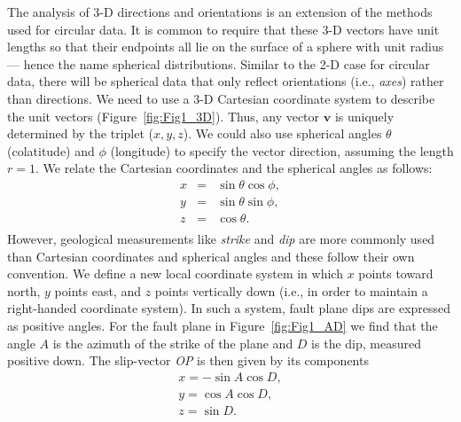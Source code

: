The analysis of 3-D directions and orientations is an extension of the methods used for circular data.
It is common to require that these 3-D vectors have unit lengths so that their endpoints all lie
on the surface of a sphere with unit radius --- hence the name spherical distributions.
Similar to the 2-D case for circular data, there will be spherical data that only reflect orientations (i.e., \emph{axes}) rather than directions.	 
\noindent
We need to use a 3-D Cartesian coordinate system to describe the unit vectors (Figure~\ref{fig:Fig1_3D}).  Thus, any 
vector $\mathbf{v}$ is uniquely determined by the triplet ($x,y,z$).  We could also use spherical angles
$\theta$ (colatitude)  and $\phi$ (longitude) to specify the vector direction, assuming the length $r=1$.
We relate the Cartesian coordinates and the spherical angles as follows:
\begin{equation}\begin{array}{rll}
x & = & \sin \theta \cos \phi,\\
y & = & \sin \theta \sin \phi,\\
z & = & \cos \theta.\\
\end{array}
\end{equation}	 	
However, geological measurements like \emph{strike} and \emph{dip} are more commonly used than Cartesian 
coordinates and spherical angles and these follow their own convention.  We define a new local 
coordinate system in which $x$ points toward north, $y$ points east, and $z$ points vertically down 
(i.e., in order to maintain a right-handed coordinate system).  In such a system, fault plane dips are 
expressed as positive angles.  For the fault plane in Figure~\ref{fig:Fig1_AD} we find that the angle $A$ is the 
azimuth of the strike of the plane and $D$ is the dip, measured positive down.  The slip-vector
\emph{OP} is then given by its components
\begin{equation} \begin{array}{lll}
x = - \sin A  \cos D,\\
y = \cos A \cos D,\\
z = \sin D.\\
\end{array}
\end{equation}

